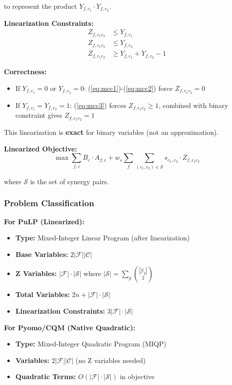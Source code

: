 \documentclass{article}
\begin{document}
to represent the product $Y_{f,c_1} \cdot Y_{f,c_2}$.

\textbf{Linearization Constraints:}
\begin{align}
Z_{f,c_1c_2} &\leq Y_{f,c_1} \label{eq:mcc1}\\
Z_{f,c_1c_2} &\leq Y_{f,c_2} \label{eq:mcc2}\\
Z_{f,c_1c_2} &\geq Y_{f,c_1} + Y_{f,c_2} - 1 \label{eq:mcc3}
\end{align}

\textbf{Correctness:}
\begin{itemize}
    \item If $Y_{f,c_1} = 0$ or $Y_{f,c_2} = 0$: (\ref{eq:mcc1})-(\ref{eq:mcc2}) force $Z_{f,c_1c_2} = 0$
    \item If $Y_{f,c_1} = Y_{f,c_2} = 1$: (\ref{eq:mcc3}) forces $Z_{f,c_1c_2} \geq 1$, combined with binary constraint gives $Z_{f,c_1c_2} = 1$
\end{itemize}

This linearization is \textbf{exact} for binary variables (not an approximation).

\textbf{Linearized Objective:}
\begin{equation}
\max \sum_{f,c} B_c \cdot A_{f,c} + w_s \sum_f \sum_{(c_1,c_2) \in \mathcal{S}} s_{c_1,c_2} \cdot Z_{f,c_1c_2}
\end{equation}

where $\mathcal{S}$ is the set of synergy pairs.

\subsubsection{Problem Classification}

\textbf{For PuLP (Linearized):}
\begin{itemize}
    \item \textbf{Type:} Mixed-Integer Linear Program (after linearization)
    \item \textbf{Base Variables:} $2|\mathcal{F}||\mathcal{C}|$
    \item \textbf{Z Variables:} $|\mathcal{F}| \cdot |\mathcal{S}|$ where $|\mathcal{S}| = \sum_g \binom{|\mathcal{G}_g|}{2}$
    \item \textbf{Total Variables:} $2n + |\mathcal{F}| \cdot |\mathcal{S}|$
    \item \textbf{Linearization Constraints:} $3|\mathcal{F}| \cdot |\mathcal{S}|$
\end{itemize}

\textbf{For Pyomo/CQM (Native Quadratic):}
\begin{itemize}
    \item \textbf{Type:} Mixed-Integer Quadratic Program (MIQP)
    \item \textbf{Variables:} $2|\mathcal{F}||\mathcal{C}|$ (no Z variables needed)
    \item \textbf{Quadratic Terms:} $O(|\mathcal{F}| \cdot |\mathcal{S}|)$ in objective
\end{itemize}
\end{document}
